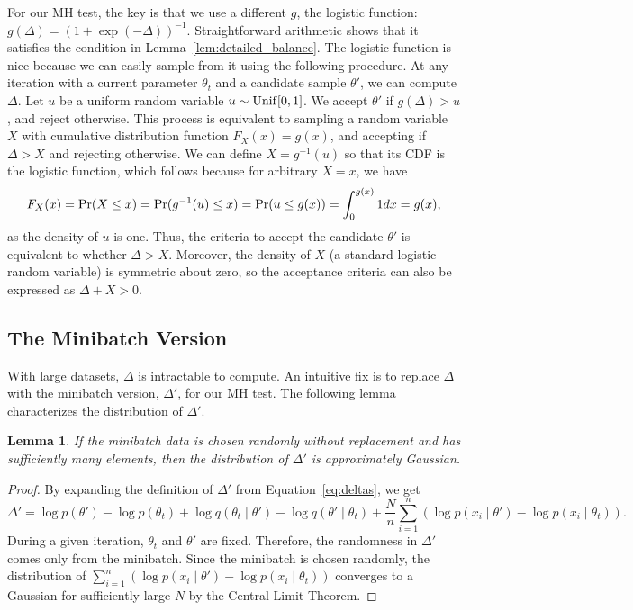 \documentclass{article}
\newtheorem{lemma}{Lemma}
\begin{document}
For our MH test, the key is that we use a different $g$, the logistic function: $g(\Delta) =
(1+\exp(-\Delta))^{-1}$. Straightforward arithmetic shows that it satisfies the condition in
Lemma~\ref{lem:detailed_balance}.  The logistic function is nice because we can easily sample from
it using the following procedure. At any iteration with a current parameter $\theta_t$ and a
candidate sample $\theta'$, we can compute $\Delta$. Let $u$ be a uniform random variable $u \sim
{\rm Unif}[0,1]$. We accept $\theta'$ if $g(\Delta) > u$, and reject otherwise. This process is
equivalent to sampling a random variable $X$ with cumulative distribution function $F_X(x) = g(x)$,
and accepting if $\Delta > X$ and rejecting otherwise. We can define $X = g^{-1}(u)$ so that its CDF
is the logistic function, which follows because for arbitrary $X = x$, we have
\[
F_X(x) = {\rm Pr}(X \le x) = {\rm Pr}(g^{-1}(u) \le x) = {\rm Pr}(u \le g(x)) = \int_{0}^{g(x)} 1 dx = g(x),
\]
as the density of $u$ is one. Thus, the criteria to accept the candidate $\theta'$ is equivalent to
whether $\Delta > X$. Moreover, the density of $X$ (a standard logistic random variable) is
symmetric about zero, so the acceptance criteria can also be expressed as $\Delta + X>0$.

\subsection{The Minibatch Version}\label{ssec:deltas_minibatch}

With large datasets, $\Delta$ is intractable to compute. An intuitive fix is to replace $\Delta$
with the minibatch version, $\Delta'$, for our MH test. The following lemma characterizes the
distribution of $\Delta'$.

\begin{lemma}\label{lem:gaussian}
If the minibatch data is chosen randomly without replacement and has sufficiently many elements,
then the distribution of $\Delta'$ is approximately Gaussian.
\end{lemma}

\begin{proof}
By expanding the definition of $\Delta'$ from Equation~\ref{eq:deltas}, we get
\[
\Delta' = \log p(\theta') - \log p(\theta_t) + \log q(\theta_t \mid \theta') - \log q(\theta' \mid \theta_t) +
\frac{N}{n}\sum_{i=1}^n (\log p(x_i\mid \theta') - \log p(x_i\mid \theta_t)).
\]
During a given iteration, $\theta_t$ and $\theta'$ are fixed. Therefore, the randomness in $\Delta'$
comes only from the minibatch. Since the minibatch is chosen randomly, the distribution of
$\sum_{i=1}^n (\log p(x_i\mid \theta') - \log p(x_i\mid \theta_t))$ converges to a Gaussian for
sufficiently large $N$ by the Central Limit Theorem.
\end{proof}
\end{document}
